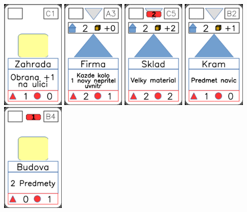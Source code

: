 \documentclass[a4paper]{article}
\begin{document}
	\includegraphics[width=3.0cm]{img-2_25}
	\includegraphics[width=3.0cm]{img-3_17}
	\includegraphics[width=3.0cm]{img-3_14}
	\includegraphics[width=3.0cm]{img-3_6}
	\includegraphics[width=3.0cm]{img-2_8}
\end{document}
